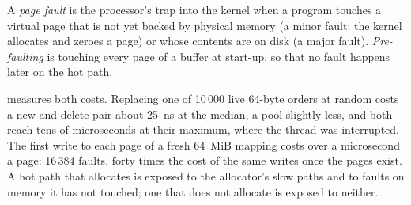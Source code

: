 \begin{definition}\label{def:ll:cpp-for-latency-i-memory:fault}
A \emph{page fault} is the processor's trap into the kernel when a program touches a virtual page that
is not yet backed by physical memory (a minor fault: the kernel allocates and zeroes a page) or whose contents are on disk
(a major fault). \emph{Pre-faulting} is touching every page of a buffer at start-up, so that no fault
happens later on the hot path.
\end{definition}

 measures both costs. Replacing one of 10\,000 live 64-byte orders at random
costs a new-and-delete pair about \qty{25}{\nano\second} at the median, a pool slightly less, and both reach tens of
microseconds at their maximum, where the thread was interrupted. The first write to each page of a fresh 64~MiB mapping
costs over a microsecond a page: 16\,384 faults, forty times the cost of the same writes once the pages exist. A hot path
that allocates is exposed to the allocator's slow paths and to faults on memory it has not touched; one that does not
allocate is exposed to neither.

